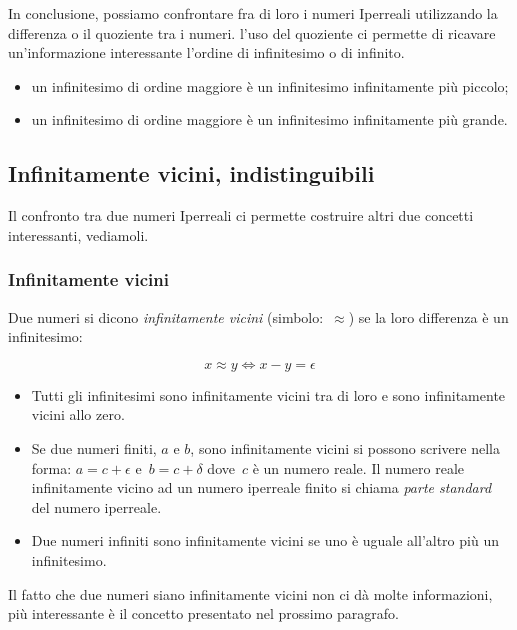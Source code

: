 In conclusione, possiamo confrontare fra di loro i numeri Iperreali utilizzando 
la differenza o il quoziente tra i numeri. l'uso del quoziente ci permette di 
ricavare un'informazione interessante l'ordine di infinitesimo o di infinito.
\begin{itemize}
 \item un infinitesimo di ordine maggiore è un infinitesimo infinitamente più 
piccolo;
 \item un infinitesimo di ordine maggiore è un infinitesimo infinitamente più 
grande.
\end{itemize}

\subsection{Infinitamente vicini, indistinguibili}
\label{subsec:insnum_infvicindist}

Il confronto tra due numeri Iperreali ci permette costruire altri due concetti 
interessanti, vediamoli. 

\subsubsection{Infinitamente vicini}
\label{subsec:insnum_infinitamentevicini}

\begin{definizione}
Due numeri si dicono \emph{infinitamente vicini} (simbolo:~$\approx$) se 
la loro differenza è un infinitesimo: 

\[x \approx y \Leftrightarrow x - y = \epsilon\]

\end{definizione}

\begin{itemize}
 \item 
Tutti gli infinitesimi sono infinitamente vicini tra di loro e sono 
infinitamente vicini allo zero.
 \item
Se due numeri finiti, $a$ e $b$, sono infinitamente vicini si possono 
scrivere nella forma: $a = c + \epsilon$ e~$b = c + \delta$ dove~$c$ è un 
numero reale. Il numero reale infinitamente vicino ad un numero iperreale 
finito si chiama \emph{parte standard} del numero iperreale.
 \item
Due numeri infiniti sono infinitamente vicini se uno è uguale all'altro più un 
infinitesimo.
\end{itemize}

Il fatto che due numeri siano infinitamente vicini non ci dà molte 
informazioni, più interessante è il concetto presentato nel prossimo paragrafo.

